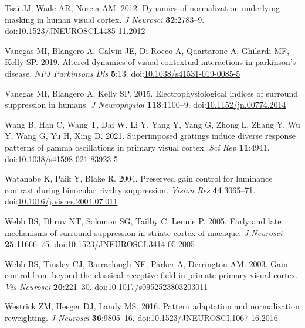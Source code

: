 \documentclass[]{article}
\begin{document}
\leavevmode\hypertarget{ref-Tsai2012}{}%
Tsai JJ, Wade AR, Norcia AM. 2012. Dynamics of normalization underlying masking in human visual cortex. \emph{J Neurosci} \textbf{32}:2783--9. doi:\href{https://doi.org/10.1523/JNEUROSCI.4485-11.2012}{10.1523/JNEUROSCI.4485-11.2012}

\leavevmode\hypertarget{ref-Vanegas2019}{}%
Vanegas MI, Blangero A, Galvin JE, Di Rocco A, Quartarone A, Ghilardi MF, Kelly SP. 2019. Altered dynamics of visual contextual interactions in parkinson's disease. \emph{NPJ Parkinsons Dis} \textbf{5}:13. doi:\href{https://doi.org/10.1038/s41531-019-0085-5}{10.1038/s41531-019-0085-5}

\leavevmode\hypertarget{ref-Vanegas2015}{}%
Vanegas MI, Blangero A, Kelly SP. 2015. Electrophysiological indices of surround suppression in humans. \emph{J Neurophysiol} \textbf{113}:1100--9. doi:\href{https://doi.org/10.1152/jn.00774.2014}{10.1152/jn.00774.2014}

\leavevmode\hypertarget{ref-Wang2021}{}%
Wang B, Han C, Wang T, Dai W, Li Y, Yang Y, Yang G, Zhong L, Zhang Y, Wu Y, Wang G, Yu H, Xing D. 2021. Superimposed gratings induce diverse response patterns of gamma oscillations in primary visual cortex. \emph{Sci Rep} \textbf{11}:4941. doi:\href{https://doi.org/10.1038/s41598-021-83923-5}{10.1038/s41598-021-83923-5}

\leavevmode\hypertarget{ref-Watanabe2004}{}%
Watanabe K, Paik Y, Blake R. 2004. Preserved gain control for luminance contrast during binocular rivalry suppression. \emph{Vision Res} \textbf{44}:3065--71. doi:\href{https://doi.org/10.1016/j.visres.2004.07.011}{10.1016/j.visres.2004.07.011}

\leavevmode\hypertarget{ref-Webb2005}{}%
Webb BS, Dhruv NT, Solomon SG, Tailby C, Lennie P. 2005. Early and late mechanisms of surround suppression in striate cortex of macaque. \emph{J Neurosci} \textbf{25}:11666--75. doi:\href{https://doi.org/10.1523/JNEUROSCI.3414-05.2005}{10.1523/JNEUROSCI.3414-05.2005}

\leavevmode\hypertarget{ref-Webb2003}{}%
Webb BS, Tinsley CJ, Barraclough NE, Parker A, Derrington AM. 2003. Gain control from beyond the classical receptive field in primate primary visual cortex. \emph{Vis Neurosci} \textbf{20}:221--30. doi:\href{https://doi.org/10.1017/s0952523803203011}{10.1017/s0952523803203011}

\leavevmode\hypertarget{ref-Westrick2016}{}%
Westrick ZM, Heeger DJ, Landy MS. 2016. Pattern adaptation and normalization reweighting. \emph{J Neurosci} \textbf{36}:9805--16. doi:\href{https://doi.org/10.1523/JNEUROSCI.1067-16.2016}{10.1523/JNEUROSCI.1067-16.2016}
\end{document}
